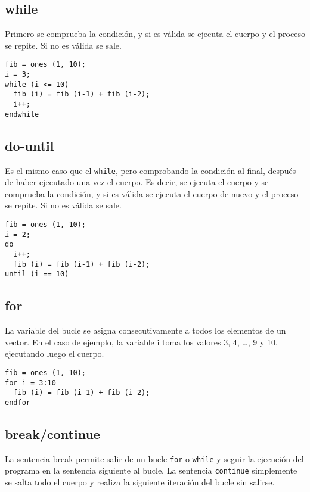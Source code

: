\subsection{while}

Primero se comprueba la condición, y si es válida se ejecuta el cuerpo
y el proceso se repite. Si no es válida se sale.

\begin{verbatim}
fib = ones (1, 10);
i = 3;
while (i <= 10)
  fib (i) = fib (i-1) + fib (i-2);
  i++;
endwhile
\end{verbatim}

\subsection{do-until}

Es el mismo caso que el  {\tt while}, pero comprobando la condición al
final, después  de haber  ejecutado una  vez el  cuerpo. Es  decir, se
ejecuta  el cuerpo  y se  comprueba la  condición, y  si es  válida se
ejecuta el cuerpo de nuevo y el  proceso se repite. Si no es válida se
sale.

\begin{verbatim}
fib = ones (1, 10);
i = 2;
do
  i++;
  fib (i) = fib (i-1) + fib (i-2);
until (i == 10)
\end{verbatim}

\subsection{for}

La variable del bucle se asigna consecutivamente a todos los elementos
de un vector. En el caso de ejemplo, la variable i toma los valores 3,
4, \dots, 9 y 10, ejecutando luego el cuerpo.

\begin{verbatim}
fib = ones (1, 10);
for i = 3:10
  fib (i) = fib (i-1) + fib (i-2);
endfor
\end{verbatim}

\subsection{break/continue}

La sentencia break permite salir de un bucle {\tt for} o {\tt while} y
seguir la ejecución  del programa en la sentencia  siguiente al bucle.
La  sentencia {\tt  continue} simplemente  se salta  todo el  cuerpo y
realiza la siguiente iteración del bucle sin salirse.


